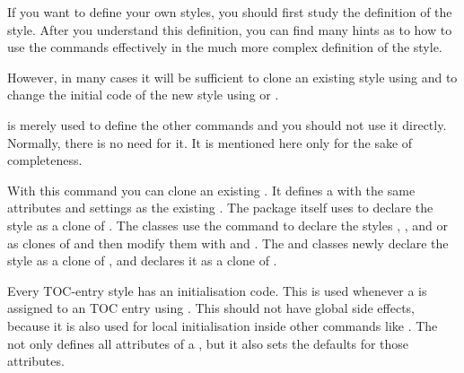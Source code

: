If you want to define your own styles, you should first study the definition
of the  style. After you understand this definition, you
can find many hints as to how to use the commands effectively in the much more
complex definition of the  style.

However, in many cases it will be sufficient to clone an existing style using
 and to change the initial code of
the new style using  or
.

 is merely used to define the other commands and
you should not use it directly. Normally, there is no need for it. It is
mentioned here only for the sake of completeness.%
\EndIndexGroup


\begin{Declaration}
\end{Declaration}
With this command you can clone
an existing . It defines a  with the same
attributes and settings as the existing . The package itself uses
 to declare the  style as a clone of
. The \KOMAScript{} classes use the command to declare
the styles , , and  or
 as clones of  and then modify them with
 and
. The  and
 classes newly declare the  style as a clone
of , and  declares it as a clone of
.%
\EndIndexGroup


\begin{Declaration}
\end{Declaration}
Every TOC-entry style has an
initialisation code. This is used whenever a  is assigned to an
TOC entry using . This
 should not have global side effects, because it is also
used for local initialisation inside other commands like
. The
 not only defines all attributes of a , but
it also sets the defaults for those attributes.

